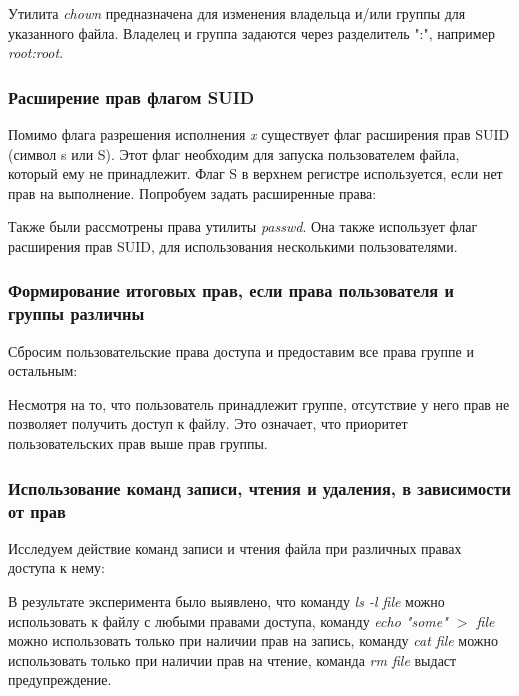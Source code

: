 \documentclass[14pt,a4paper,report]{report}
\begin{document}
Утилита \emph{chown} предназначена для изменения владельца и/или группы для указанного файла. Владелец и группа задаются через разделитель ":", например \emph{root:root}.

\subsubsection{Расширение прав флагом SUID}

Помимо флага разрешения исполнения \emph{x} существует флаг расширения прав SUID (символ s или S). Этот флаг необходим для запуска пользователем файла, который ему не принадлежит. Флаг S в верхнем регистре используется, если нет прав на выполнение. Попробуем задать расширенные права:



Также были рассмотрены права утилиты \emph{passwd}. Она также использует флаг расширения прав SUID, для использования несколькими пользователями.

\subsubsection{Формирование итоговых прав, если права пользователя и группы различны}

Сбросим пользовательские права доступа и предоставим все права группе и остальным:



Несмотря на то, что пользователь принадлежит группе, отсутствие у него прав не позволяет получить доступ к файлу. Это означает, что приоритет пользовательских прав выше прав группы.

\subsubsection{Использование команд записи, чтения и удаления, в зависимости от прав}

Исследуем действие команд записи и чтения файла при различных правах доступа к нему:



В результате эксперимента было выявлено, что команду \emph{ls -l file} можно использовать к файлу с любыми правами доступа, команду \emph{echo "some" $>$ file} можно использовать только при наличии прав на запись, команду  \emph{cat file} можно использовать только при наличии прав на чтение, команда \emph{rm file} выдаст предупреждение.
\end{document}
